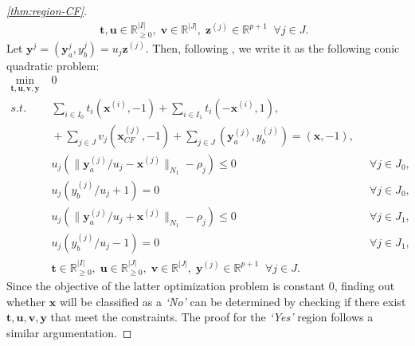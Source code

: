 \documentclass{article}
\begin{document}
{\begin{proof}[\cref{thm:region-CF}]
$$\begin{array}{lllll}
 &\; \bm{t},\bm{u}\in\mathbb{R}^{|I|}_{\geq 0},\; \bm{v}\in\mathbb{R}^{|J|},\; \bm{z}^{(j)}\in\mathbb{R}^{p+1}\;\;\forall j\in J. &&
\end{array}$$
Let $\bm{y}^{j}= (\bm{y}^{j}_a,y_b^j)=u_j\bm{z}^{(j)}$. Then, following \citet[Theorem 2.2]{bertsimas_robust_2022}, we write it as the following conic quadratic problem:
$$\begin{array}{lllll}
\underset{\bm{t,u,v,y}}{\min}& \;0\\
 s.t.&\;  \sum_{i \in I_{0}}t_{i}(\bm{x}^{(i)},-1)+\sum_{i \in I_1}t_{i}(-\bm{x}^{(i)},1), \\
 &\;+\sum_{j\in J}v_j (\bm{x}_{CF}^{(j)},-1)+\sum_{j\in J}(\bm{y}_a^{(j)},y_b^{(j)})=(\bm{x},-1), &\\
 &\;u_j(\| \bm{y}_a^{(j)}/u_j - \bm{x}^{(j)}\|_{N_1} - \rho_j)\leq  0&\;\;\forall j\in J_{0}, \\
 &\;u_j (y_b^{(j)}/u_j + 1)=0&\;\;\forall j\in J_{0},\\
 &\;u_j(\| \bm{y}_a^{(j)}/u_j + \bm{x}^{(j)}\|_{N_1} - \rho_j)\leq  0&\;\;\forall j\in J_1,\\
 &\;u_j (y_b^{(j)}/u_j - 1)=0&\;\;\forall j\in J_1,\\
 &\; \bm{t}\in\mathbb{R}^{|I|}_{\geq 0},\; \bm{u}\in\mathbb{R}^{|J|}_{\geq 0},\; \bm{v}\in\mathbb{R}^{|J|},\; \bm{y}^{(j)}\in\mathbb{R}^{p+1}\;\;\forall j\in J.&&
\end{array}$$
Since the objective of the latter optimization problem is constant 0, finding out whether $\bm{x}$ will be classified as a \textit{`No'} can be determined by checking if there exist $\bm{t},\bm{u},\bm{v},\bm{y}$ that meet the constraints.
The proof for the \textit{`Yes'} region follows a similar argumentation.
\end{proof}

}
\end{document}
